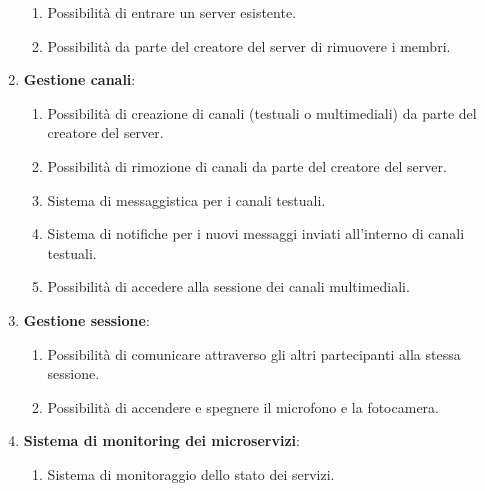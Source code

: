 \begin{enumerate}
\begin{enumerate}[label*=\arabic*.]
        \item Possibilità di entrare un server esistente.
        
        \item Possibilità da parte del creatore del server di rimuovere i membri.
    \end{enumerate}
    \item \textbf{Gestione canali}:
    \begin{enumerate}[label*=\arabic*.]
        \item Possibilità di creazione di canali (testuali o multimediali) da parte del creatore del server.
    
        \item Possibilità di rimozione di canali da parte del creatore del server.

        \item Sistema di messaggistica per i canali testuali.

        \item Sistema di notifiche per i nuovi messaggi inviati all'interno di canali testuali.

        \item Possibilità di accedere alla sessione dei canali multimediali.
    \end{enumerate}

    \item \textbf{Gestione sessione}:
    \begin{enumerate}[label*=\arabic*.]
        \item Possibilità di comunicare attraverso gli altri partecipanti alla stessa sessione.

        \item Possibilità di accendere e spegnere il microfono e la fotocamera.
    \end{enumerate}

    \item \textbf{Sistema di monitoring dei microservizi}:
    \begin{enumerate}[label*=\arabic*.]
        \item Sistema di monitoraggio dello stato dei servizi.
    \end{enumerate}
    
\end{enumerate}

